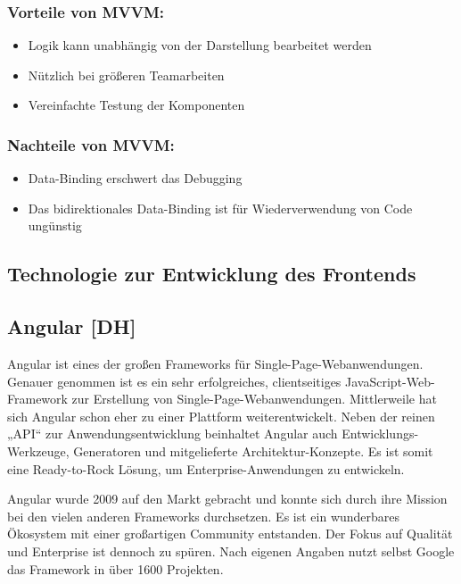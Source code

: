 \subsubsection{Vorteile von MVVM:}

\begin{itemize}
  \item Logik kann unabhängig von der Darstellung bearbeitet werden
  \item Nützlich bei größeren Teamarbeiten
  \item Vereinfachte Testung der Komponenten
\end{itemize}

\subsubsection{Nachteile von MVVM:}

\begin{itemize}
  \item Data-Binding erschwert das Debugging
  \item	Das bidirektionales Data-Binding ist für Wiederverwendung von Code ungünstig
\end{itemize}

\cite{mvcBild} \cite{mvcVSmvvm}

\newpage

\subsection{Technologie zur Entwicklung des Frontends}
\subsection{Angular [DH]}
Angular ist eines der großen Frameworks für Single-Page-Webanwendungen. Genauer genommen ist es ein sehr erfolgreiches, clientseitiges JavaScript-Web-Framework zur Erstellung von Single-Page-Webanwendungen. Mittlerweile hat sich Angular schon eher zu einer Plattform weiterentwickelt. Neben der reinen „API“ zur Anwendungsentwicklung beinhaltet Angular auch Entwicklungs-Werkzeuge, Generatoren und mitgelieferte Architektur-Konzepte. Es ist somit eine Ready-to-Rock Lösung, um Enterprise-Anwendungen zu entwickeln.

Angular wurde 2009 auf den Markt gebracht und konnte sich durch ihre Mission bei den vielen anderen Frameworks durchsetzen. Es ist ein wunderbares Ökosystem mit einer großartigen Community entstanden. Der Fokus auf Qualität und Enterprise ist dennoch zu spüren. Nach eigenen Angaben nutzt selbst Google das Framework in über 1600 Projekten.

